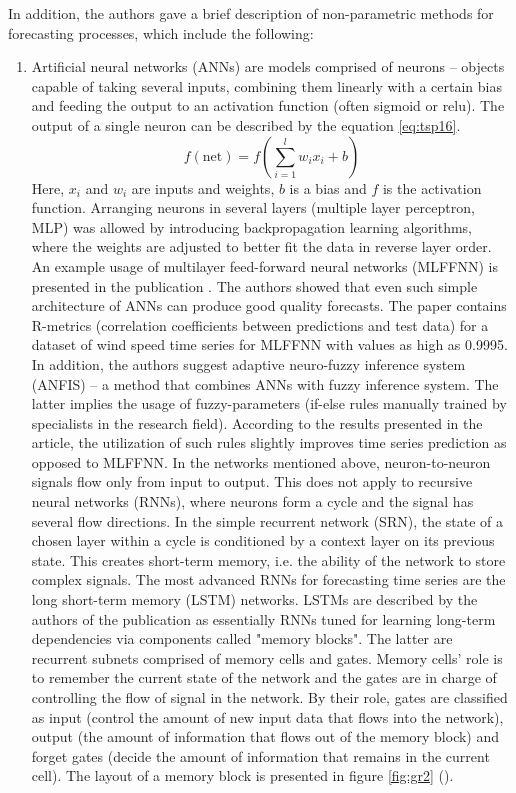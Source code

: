 \documentclass[3p,times,procedia]{elsarticle}
\begin{document}
In addition, the authors gave a brief description of non-parametric methods for forecasting processes, which include the following:
\begin{enumerate}
	\item Artificial neural networks (ANNs) are models comprised of neurons -- objects capable of taking several inputs, combining them linearly with a certain bias and feeding the output to an activation function (often sigmoid or relu). The output of a single neuron can be described by the equation \ref{eq:tsp16}.
\begin{equation} \label{eq:tsp16}
f(\mathrm{net}) = f\left( \sum_{i=1}^l w_i x_i + b \right)
\end{equation}
Here, $x_i$ and $w_i$ are inputs and weights, $b$ is a bias and $f$ is the activation function. Arranging neurons in several layers (multiple layer perceptron, MLP) was allowed by introducing backpropagation learning algorithms, where the weights are adjusted to better fit the data in reverse layer order.
An example usage of multilayer feed-forward neural networks (MLFFNN) is presented in the publication \cite{khosravi2018time}. The authors showed that even such simple architecture of ANNs can produce good quality forecasts. The paper contains R-metrics (correlation coefficients between predictions and test data) for a dataset of wind speed time series for MLFFNN with values as high as 0.9995.
In addition, the authors suggest adaptive neuro-fuzzy inference system (ANFIS) -- a method that combines ANNs with fuzzy inference system. The latter implies the usage of fuzzy-parameters (if-else rules manually trained by specialists in the research field). According to the results presented in the article, the utilization of such rules slightly improves time series prediction as opposed to MLFFNN.
In the networks mentioned above, neuron-to-neuron signals flow only from input to output. This does not apply to recursive neural networks (RNNs), where neurons form a cycle and the signal has several flow directions. In the simple recurrent network (SRN), the state of a chosen layer within a cycle is conditioned by a context layer on its previous state. This creates short-term memory, i.e. the ability of the network to store complex signals.
The most advanced RNNs for forecasting time series are the long short-term memory (LSTM) networks. LSTMs are described by the authors of the publication \cite{hua2019deep} as essentially RNNs tuned for learning long-term dependencies via components called "memory blocks". The latter are recurrent subnets comprised of memory cells and gates. Memory cells' role is to remember the current state of the network and the gates are in charge of controlling the flow of signal in the network. By their role, gates are classified as input (control the amount of new input data that flows into the network), output (the amount of information that flows out of the memory block) and forget gates (decide the amount of information that remains in the current cell). The layout of a memory block is presented in figure \ref{fig:gr2} (\cite{hua2019deep}).

\end{enumerate}
\end{document}
